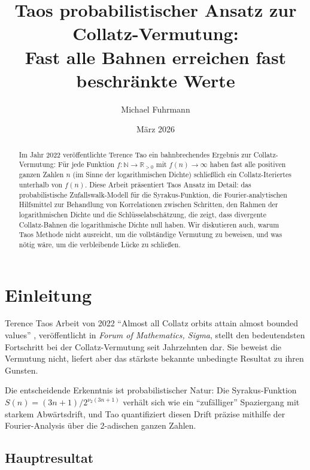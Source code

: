 \documentclass[12pt,a4paper]{article}
\begin{document}
\title{Taos probabilistischer Ansatz zur Collatz-Vermutung:\\
Fast alle Bahnen erreichen fast beschränkte Werte}
\author{Michael Fuhrmann}
\date{März 2026}
\maketitle

\begin{abstract}
Im Jahr 2022 veröffentlichte Terence Tao ein bahnbrechendes Ergebnis zur Collatz-Vermutung:
Für jede Funktion $f\colon \mathbb{N} \to \mathbb{R}_{>0}$ mit $f(n) \to \infty$ haben
fast alle positiven ganzen Zahlen $n$ (im Sinne der logarithmischen Dichte) schließlich
ein Collatz-Iteriertes unterhalb von $f(n)$. Diese Arbeit präsentiert Taos Ansatz im
Detail: das probabilistische Zufallswalk-Modell für die Syrakus-Funktion, die
Fourier-analytischen Hilfsmittel zur Behandlung von Korrelationen zwischen Schritten,
den Rahmen der logarithmischen Dichte und die Schlüsselabschätzung, die zeigt, dass
divergente Collatz-Bahnen die logarithmische Dichte null haben. Wir diskutieren auch,
warum Taos Methode nicht ausreicht, um die vollständige Vermutung zu beweisen, und
was nötig wäre, um die verbleibende Lücke zu schließen.
\end{abstract}

\tableofcontents

\newpage

\section{Einleitung}

Terence Taos Arbeit von 2022 ``Almost all Collatz orbits attain almost bounded values''
\cite{Tao2022}, veröffentlicht in \emph{Forum of Mathematics, Sigma}, stellt den bedeutendsten
Fortschritt bei der Collatz-Vermutung seit Jahrzehnten dar. Sie beweist die Vermutung
nicht, liefert aber das stärkste bekannte unbedingte Resultat zu ihren Gunsten.

Die entscheidende Erkenntnis ist probabilistischer Natur: Die Syrakus-Funktion
$S(n) = (3n+1)/2^{\nu_2(3n+1)}$ verhält sich wie ein ``zufälliger'' Spaziergang mit
starkem Abwärtsdrift, und Tao quantifiziert diesen Drift präzise mithilfe der
Fourier-Analysis über die 2-adischen ganzen Zahlen.

\subsection{Hauptresultat}
\end{document}

